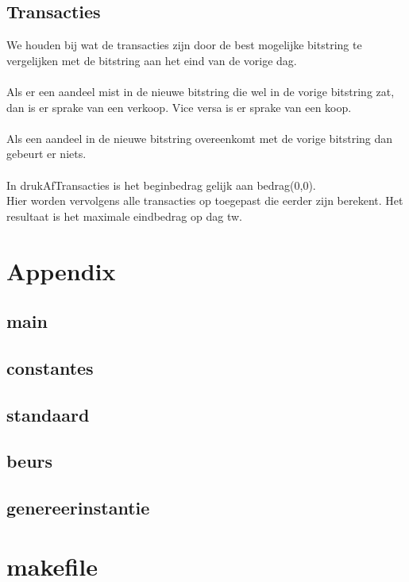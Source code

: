 \documentclass{article}
\begin{document}
\subsection{Transacties}
We houden bij wat de transacties zijn door de best mogelijke bitstring te vergelijken met de bitstring aan het eind van de vorige dag.\\\\
Als er een aandeel mist in de nieuwe bitstring die wel in de vorige bitstring zat, dan is er sprake van een verkoop. Vice versa is er sprake van een koop. \\\\
Als een aandeel in de nieuwe bitstring overeenkomt met de vorige bitstring dan gebeurt er niets.\\\\
In drukAfTransacties is het beginbedrag gelijk aan bedrag(0,0).\\ Hier worden vervolgens alle transacties op toegepast die eerder zijn berekent. Het resultaat is het maximale eindbedrag op dag tw.
\section{Appendix}
\subsection{main}

\subsection{constantes}

\subsection{standaard}


\subsection{beurs}


\subsection{genereerinstantie}


\section{makefile}


\end{document}
